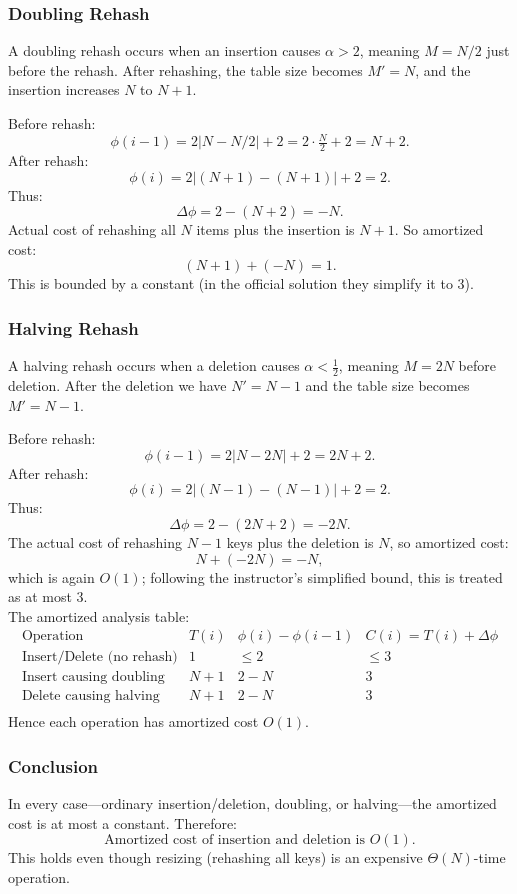 \documentclass[9pt]{extarticle}
\begin{document}
\subsubsection*{Doubling Rehash}
A doubling rehash occurs when an insertion causes \(\alpha > 2\), meaning
\(M = N/2\) just before the rehash. After rehashing, the table size becomes
\(M' = N\), and the insertion increases \(N\) to \(N+1\).

Before rehash:
\[
\phi(i-1) = 2|N - N/2| + 2 = 2 \cdot \tfrac{N}{2} + 2 = N + 2.
\]
After rehash:
\[
\phi(i) = 2|(N+1) - (N+1)| + 2 = 2.
\]
Thus:
\[
\Delta \phi = 2 - (N + 2) = -N.
\]
Actual cost of rehashing all \(N\) items plus the insertion is \(N + 1\).
So amortized cost:
\[
(N+1) + (-N) = 1.
\]
This is bounded by a constant (in the official solution they simplify it to \(3\)).

\subsubsection*{Halving Rehash}
A halving rehash occurs when a deletion causes \(\alpha < \tfrac12\), meaning
\(M = 2N\) before deletion. After the deletion we have \(N' = N-1\) and the
table size becomes \(M' = N-1\).

Before rehash:
\[
\phi(i-1) = 2|N - 2N| + 2 = 2N + 2.
\]
After rehash:
\[
\phi(i) = 2|(N-1)-(N-1)| + 2 = 2.
\]
Thus:
\[
\Delta \phi = 2 - (2N + 2) = -2N.
\]
The actual cost of rehashing \(N-1\) keys plus the deletion is \(N\), so
amortized cost:
\[
N + (-2N) = -N,
\]
which is again \(O(1)\); following the instructor’s simplified bound, this is
treated as at most \(3\).\\
The amortized analysis table:
\[
\begin{array}{c|c|c|c}
\text{Operation} & T(i) & \phi(i)-\phi(i-1) & C(i) = T(i)+\Delta\phi \\
\hline
\text{Insert/Delete (no rehash)} & 1     & \le 2     & \le 3 \\
\text{Insert causing doubling}   & N+1   & 2 - N     & 3    \\
\text{Delete causing halving}    & N+1   & 2 - N     & 3    \\
\end{array}
\]
Hence each operation has amortized cost $O(1)$.

\subsubsection*{Conclusion}
In every case---ordinary insertion/deletion, doubling, or halving---the
amortized cost is at most a constant. Therefore:
\[
\boxed{\text{Amortized cost of insertion and deletion is } O(1).}
\]
This holds even though resizing (rehashing all keys) is an expensive
\(\Theta(N)\)-time operation.
\end{document}
